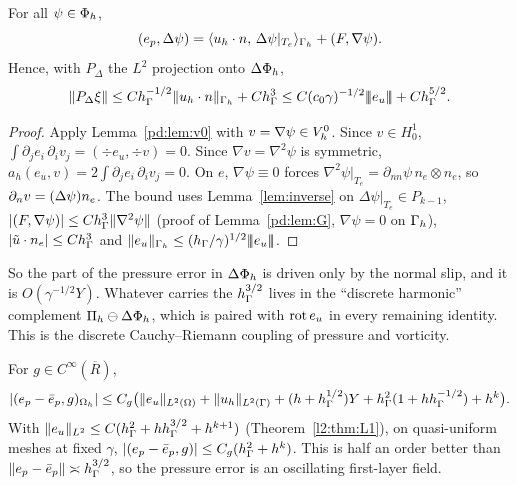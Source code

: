 \begin{lemma}\label{pd:lem:A2}
For all $\psi\in\Phi_h$,
\[
(e_p,\Delta\psi)=\langle u_h\cdot n,\, \Delta\psi|_{T_e}\rangle_{\Gamma_h}+(F,\nabla\psi).
\]
Hence, with $P_\Delta$ the $L^2$ projection onto $\Delta\Phi_h$,
\[
\lVert P_\Delta\xi\rVert\le Ch_\Gamma^{-1/2}\lVert u_h\cdot n\rVert_{\Gamma_h}+Ch_\Gamma^3\le C(c_0\gamma)^{-1/2}|\!|\!|e_u|\!|\!|+Ch_\Gamma^{5/2}.
\]
\end{lemma}

\begin{proof}
Apply Lemma~\ref{pd:lem:v0} with $v=\nabla\psi\in V_h^0$. Since $v\in H^1_0$, $\int\partial_je_i\,\partial_iv_j=(\div e_u,\div v)=0$. Since $\nabla v=\nabla^2\psi$ is symmetric, $a_h(e_u,v)=2\int\partial_je_i\,\partial_iv_j=0$. On $e$, $\nabla\psi\equiv0$ forces $\nabla^2\psi|_{T_e}=\partial_{nn}\psi\,n_e\otimes n_e$, so $\partial_n v=(\Delta\psi)n_e$. The bound uses Lemma~\ref{lem:inverse} on $\Delta\psi|_{T_e}\in P_{k-1}$, $|(F,\nabla\psi)|\le Ch_\Gamma^3\lVert \nabla^2\psi\rVert$ (proof of Lemma~\ref{pd:lem:G}, $\nabla\psi=0$ on $\Gamma_h$), $|\tilde u\cdot n_e|\le Ch_\Gamma^3$ and $\lVert e_u\rVert_{\Gamma_h}\le(h_\Gamma/\gamma)^{1/2}|\!|\!|e_u|\!|\!|$.
\end{proof}

So the part of the pressure error in $\Delta\Phi_h$ is driven only by the normal slip, and it is $O(\gamma^{-1/2}Y)$. Whatever carries the $h_\Gamma^{3/2}$ lives in the ``discrete harmonic'' complement $\Pi_h\ominus\Delta\Phi_h$, which is paired with $\operatorname{rot} e_u$ in every remaining identity. This is the discrete Cauchy--Riemann coupling of pressure and vorticity.

\begin{lemma}\label{pd:lem:A3}
For $g\in C^\infty(\overline R)$,
\[
|(e_p-\bar e_p,g)_{\Omega_h}|\le C_g\bigl(\lVert e_u\rVert_{L^2(\Omega)}+\lVert u_h\rVert_{L^2(\Gamma)}+(h+h_\Gamma^{1/2})Y+h_\Gamma^2(1+hh_\Gamma^{-1/2})+h^k\bigr).
\]
With $\lVert e_u\rVert_{L^2}\le C(h_\Gamma^2+hh_\Gamma^{3/2}+h^{k+1})$ (Theorem~\ref{l2:thm:L1}), on quasi-uniform meshes at fixed $\gamma$, $|(e_p-\bar e_p,g)|\le C_g(h_\Gamma^2+h^k)$. This is half an order better than $\lVert e_p-\bar e_p\rVert\asymp h_\Gamma^{3/2}$, so the pressure error is an oscillating first-layer field.
\end{lemma}

